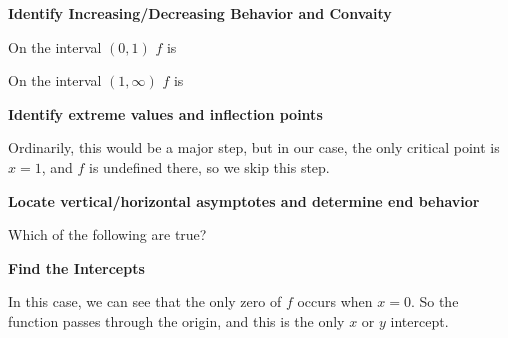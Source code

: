 \documentclass{ximera}
\begin{document}
\begin{question}
\begin{solution}
 \end{solution}
 
 \textbf{Identify Increasing/Decreasing Behavior and Convaity}
 
 \begin{solution}
 On the interval $(0,1)$ $f$ is
 
 \begin{multipleChoice}
    \end{multipleChoice}
    
  On the interval $(1,\infty)$ $f$ is
 
  \begin{multipleChoice}
    \end{multipleChoice}
    \end{solution}
    
 \textbf{Identify extreme values and inflection points}
 
 Ordinarily, this would be a major step, but in our case, the only critical point is $x=1$, and $f$ is undefined there, so we skip this step.
 
 \textbf{Locate vertical/horizontal asymptotes and determine end behavior}
 
 \begin{solution}
 Which of the following are true?
 
 \begin{multipleChoice}
    \end{multipleChoice}
    \end{solution}
  \textbf{Find the Intercepts}
  
  In this case, we can see that the only zero of $f$ occurs when $x=0$.  So the function passes through the origin, and this is the only $x$ or $y$ intercept.
  

\end{question}
\end{document}
